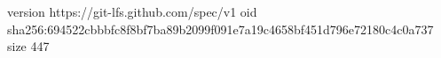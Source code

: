 version https://git-lfs.github.com/spec/v1
oid sha256:694522cbbbfc8f8bf7ba89b2099f091e7a19c4658bf451d796e72180c4c0a737
size 447
